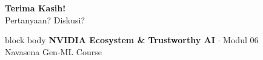 \documentclass[aspectratio=169,t]{beamer}
\begin{document}
\begin{frame}[plain]
  \vspace{2cm}
  \begin{center}
    {\color{nvgreen}\Huge\bfseries Terima Kasih!}\\[1.5em]
    {\color{nvgray}\Large Pertanyaan? Diskusi?}\\[2em]
    \begin{beamercolorbox}[rounded=true,shadow=false,sep=8pt,wd=10cm]{block body}
      \centering\color{white}
      \textbf{NVIDIA Ecosystem \& Trustworthy AI} \quad $\cdot$ \quad Modul 06 \\
      Navasena Gen-ML Course
    \end{beamercolorbox}
  \end{center}
\end{frame}
\end{document}
